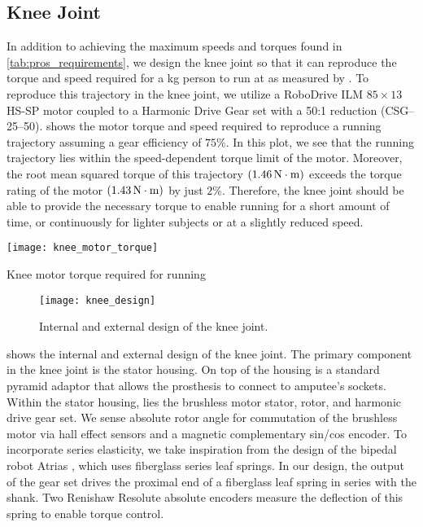\subsection{Knee Joint}

In addition to achieving the maximum speeds and torques found in
\cref{tab:pros_requirements}, we design the knee joint so that it can reproduce
the torque and speed required for a \unit[80]{kg} person to run at
 as measured by \citet{novacheck1998biomechanics}. To
reproduce this trajectory in the knee joint, we utilize a RoboDrive ILM
$85\times13$ HS-SP motor coupled to a Harmonic Drive Gear set with a 50:1
reduction (CSG--25--50).  shows the motor torque
and speed required to reproduce a running trajectory assuming a gear
efficiency of $75\%$. In this plot, we see that the running trajectory lies
within the speed-dependent torque limit of the motor. Moreover, the root mean
squared torque of this trajectory $(\unit[1.46]{N \cdot m})$ exceeds the torque
rating of the motor $(\unit[1.43]{N \cdot m})$ by just $2\%$. Therefore, the
knee joint should be able to provide the necessary torque to enable running for
a short amount of time, or continuously for lighter subjects or at a slightly
reduced speed.
\begin{marginfigure}[-2in]
    \centering 
    \texttt{[image: knee\_motor\_torque]}
    \caption{Knee motor torque required for
    running}\label{fig:knee_motor_torque}
\end{marginfigure}

\begin{figure*}[t]
    \centering 
    \texttt{[image: knee\_design]}
    \caption{Internal and external design of the knee 
    joint.}\label{fig:knee_design}
\end{figure*}
 shows the internal and external design of the knee joint.
The primary component in the knee joint is the stator housing. On top of the
housing is a standard pyramid adaptor that allows the prosthesis to connect to
amputee's sockets. Within the stator housing, lies the brushless motor stator,
rotor, and harmonic drive gear set. We sense absolute rotor angle for
commutation of the brushless motor via hall effect sensors and a magnetic
complementary sin/cos encoder. To incorporate series elasticity, we take
inspiration from the design of the bipedal robot Atrias
\citep{grimes2013atrias}, which uses fiberglass series leaf springs. In our
design, the output of the gear set drives the proximal end of a fiberglass leaf
spring in series with the shank. Two Renishaw Resolute absolute encoders measure
the deflection of this spring to enable torque control.

